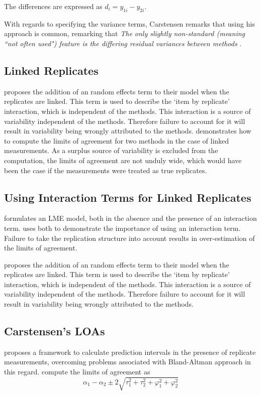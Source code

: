 \documentclass[12pt, a4paper]{report}
\theoremstyle{plain}
\theoremstyle{definition}
\theoremstyle{remark}
\begin{document}
The differences are expressed as $d_{i} = y_{1i} - y_{2i}$.	

With regards to specifying the variance terms, Carstensen remarks that using his approach is common, remarking that \emph{The only slightly non-standard (meaning ``not often used") feature is the differing residual variances between methods }\citep{BXC2010}.

\subsection{Linked Replicates}


\citet{BXC2008} proposes the addition of an random effects term to their model when the replicates are linked. This term is used to describe the `item by replicate' interaction, which is independent of the methods. This interaction is a source of variability independent of the methods. Therefore failure to account for it will result in variability being wrongly attributed to the methods. \citet{BXC2008} demonstrates how to compute the limits of agreement for two methods in the case of linked measurements. As a surplus source of variability is excluded from the computation, the limits of agreement are not unduly wide, which would have been the case if the measurements were treated as true replicates.




\subsection{Using Interaction Terms for Linked Replicates}
\citet{BXC2008} formulates an LME model, both in the absence and the presence of an interaction term. \citet{BXC2008} uses both to demonstrate the importance of using an interaction term. Failure to take the replication structure into account results in over-estimation of the limits of agreement.

\citet{BXC2008} proposes the addition of an random effects term to their model when the replicates are linked. This term is used to describe the `item by replicate' interaction, which is independent of the methods. This interaction is a source of variability independent of the methods. Therefore failure to account for it will result in variability being wrongly attributed to the methods.



\subsection{Carstensen's LOAs}
\citet{BXC2008} proposes a framework to calculate prediction intervals in the presence of replicate measurements, overcoming problems associated with Bland-Altman approach in this regard. \citet{BXC2008} compute the limits of agreement as
\[
\alpha_1 - \alpha_2 \pm 2 \sqrt{ \tau^2_1 +  \tau^2_2 +  \varphi^2_1 +  \varphi^2_2 }
\]
\end{document}
